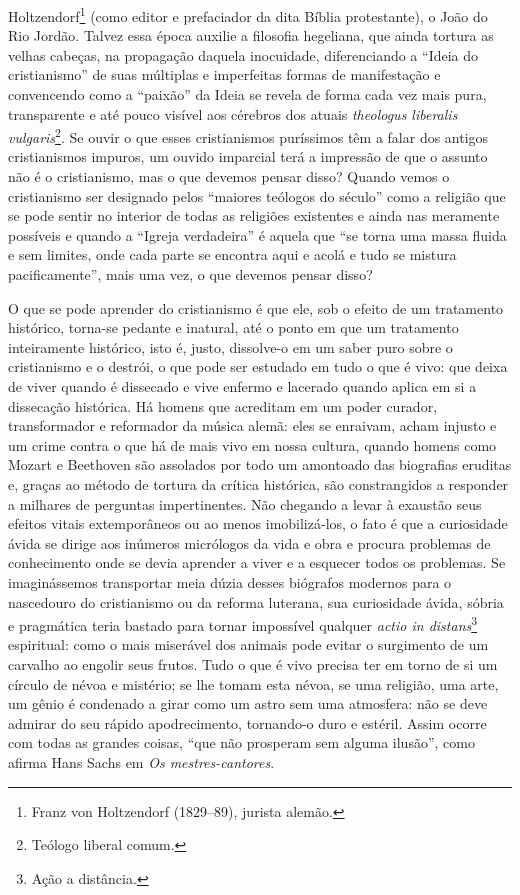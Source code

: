 Holtzendorf\footnote{Franz von Holtzendorf (1829--89), jurista alemão.}
(como editor e prefaciador da dita Bíblia protestante), o João do Rio
Jordão. Talvez essa época auxilie a filosofia hegeliana, que ainda
tortura as velhas cabeças, na propagação daquela inocuidade,
diferenciando a ``Ideia do cristianismo'' de suas múltiplas e
imperfeitas formas de manifestação e convencendo como a ``paixão'' da
Ideia se revela de forma cada vez mais pura, transparente e até pouco
visível aos cérebros dos atuais \emph{theologus liberalis
vulgaris}\footnote{Teólogo liberal comum.}. Se ouvir o que esses
cristianismos puríssimos têm a falar dos antigos cristianismos impuros,
um ouvido imparcial terá a impressão de que o assunto não é o
cristianismo, mas o que devemos pensar disso? Quando vemos o
cristianismo ser designado pelos ``maiores teólogos do século'' como a
religião que se pode sentir no interior de todas as religiões existentes
e ainda nas meramente possíveis e quando a ``Igreja verdadeira'' é
aquela que ``se torna uma massa fluida e sem limites, onde cada parte se
encontra aqui e acolá e tudo se mistura pacificamente'', mais uma vez,
o que devemos pensar disso?

O que se pode aprender do cristianismo é que ele, sob o efeito de um
tratamento histórico, torna-se pedante e inatural, até o ponto em que um
tratamento inteiramente histórico, isto é, justo, dissolve-o em um saber
puro sobre o cristianismo e o destrói, o que pode ser estudado em tudo o
que é vivo: que deixa de viver quando é dissecado e vive enfermo e
lacerado quando aplica em si a dissecação histórica. Há homens que
acreditam em um poder curador, transformador e reformador da música
alemã: eles se enraivam, acham injusto e um crime contra o que há de
mais vivo em nossa cultura, quando homens como Mozart e Beethoven são
assolados por todo um amontoado das biografias eruditas e, graças ao
método de tortura da crítica histórica, são constrangidos a responder a
milhares de perguntas impertinentes. Não chegando a levar à exaustão
seus efeitos vitais extemporâneos ou ao menos imobilizá-los, o fato é
que a curiosidade ávida se dirige aos inúmeros micrólogos da vida e obra
e procura problemas de conhecimento onde se devia aprender a viver e a
esquecer todos os problemas. Se imaginássemos transportar meia dúzia
desses biógrafos modernos para o nascedouro do cristianismo ou da
reforma luterana, sua curiosidade ávida, sóbria e pragmática teria
bastado para tornar impossível qualquer \emph{actio in
distans}\footnote{Ação a distância.} espiritual: como o mais miserável
dos animais pode evitar o surgimento de um carvalho ao engolir seus
frutos. Tudo o que é vivo precisa ter em torno de si um círculo de névoa
e mistério; se lhe tomam esta névoa, se uma religião, uma arte, um gênio
é condenado a girar como um astro sem uma atmosfera: não se deve admirar
do seu rápido apodrecimento, tornando-o duro e estéril. Assim ocorre com
todas as grandes coisas, ``que não prosperam sem alguma ilusão'', como
afirma Hans Sachs em \emph{Os mestres-cantores}.

